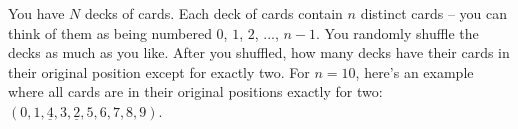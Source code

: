   You have $N$ decks of cards.
  Each deck of cards contain $n$ distinct cards -- you can think of them as being numbered
  $0$, $1$, $2$, ..., $n-1$.
  You randomly shuffle the decks as much as you like.
  After you shuffled,
  how many decks
  have their cards in their original position except for exactly two.
  For $n = 10$, here's an example
  where all cards are in their original positions exactly for two:
  $(0,1,\underline{4},3,\underline{2},5,6,7,8,9)$.
